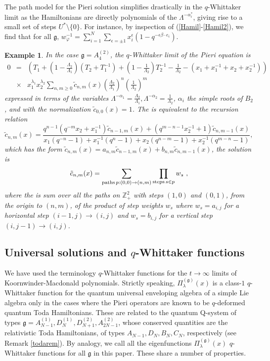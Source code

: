 \documentclass[12pt]{amsart}
\newtheorem{example}[thm]{Example}
\newcommand{\g}{{\mathfrak{g}}}
\newcommand{\Z}{{\mathbb Z}}
\newcommand{\al}{{\alpha}}
\newcommand{\lL}{{\Lambda}}
\numberwithin{equation}{section}
\begin{document}
The path model for the Pieri solution simplifies drastically in the $q$-Whittaker limit
as the Hamiltonians are directly polynomials of the $\lL^{-\al_i^*}$, giving rise to a small set of steps $U^*\setminus\{0\}$. For instance, by inspection of (\ref{Hamil}-\ref{Hamil2}), we find that for all $\g$, $w_\varphi^{-1}=\sum_{i=1}^N\sum_{\epsilon=\pm1} x_i^{\epsilon}(1-q^{-\epsilon\beta\cdot e_i})$.

%
%
%
%
%
%
%
%
%
%
%
%
%
%
%

\begin{example}
In the case $\g=A_4^{(2)}$, the $q$-Whittaker limit of the Pieri equation is
\begin{eqnarray*}
0&=&\left(T_1+\left(1-\frac{\lL_2}{\lL_1}\right) (T_2+T_1^{-1})+\left(1-\frac{1}{\lL_2}\right) T_2^{-1} -\frac{1}{\lL_2}-(x_1+x_1^{-1}+x_2+x_2^{-1})\right)\\
& \times& x_1^{\lambda_1}x_2^{\lambda_2} \sum_{n,m\geq 0}
{\tilde c}_{n,m}(x) \left(\frac{\lL_2}{\lL_1}\right)^n\left(\frac{1}{\lL_2}\right)^m
\end{eqnarray*}
expressed in terms of the variables $\lL^{-\al_1}=\frac{\lL_2}{\lL_1},\lL^{-\al_2}=\frac{1}{\lL_2}$,
$\al_i$ the simple roots of $B_2$, and  with the normalization ${\tilde c}_{0,0}(x) =1$.
The is equivalent to the recursion relation
$${\tilde c}_{n,m}(x)=\frac{q^{n-1}(q^{-m}x_2+x_1^{-1}){\tilde c}_{n-1,m}(x)+(q^{m-n-1}x_2^{-1}+1){\tilde c}_{n,m-1}(x)}{x_1(q^{-n}-1)+x_1^{-1}(q^n-1)+x_2(q^{n-m}-1)+x_2^{-1}(q^{m-n}-1)},$$
which has the form ${\tilde c}_{n,m}(x)=a_{n,m}{\tilde c}_{n-1,m}(x)+b_{n,m}{\tilde c}_{n,m-1}(x)$, the solution is
$${\tilde c}_{n,m}(x) =\sum_{{\rm paths}\, p: (0,0)\to (n,m)} \prod_{{\rm steps}\,   s\in p} w_s \ ,$$
where the is sum over all the paths on $\Z_+^2$ with steps $(1,0)$ and $(0,1)$, from the origin to $(n,m)$, of the product of step weights $w_s$ where 
$w_s=a_{i,j}$ for a horizontal step $(i-1,j)\to (i,j)$ and $w_s=b_{i,j}$ for a vertical step $(i,j-1)\to (i,j)$.
\end{example}


 
\subsection{Universal solutions and $q$-Whittaker functions}\label{sec:whitak}
We have used the terminology $q$-Whittaker functions for the $t\to\infty$ limits of Koornwinder-Macdonald polynomials. Strictly speaking,
$\Pi_\lambda^{(\g)}(x)$ is a class-$1$ $q$-Whittaker function for the quantum universal enveloping algebra of a simple Lie algebra only in the cases where the Pieri operators are known to be $q$-deformed quantum Toda Hamiltonians.
These are related to the quantum Q-system of types
$\g=A_{N-1}^{(1)},D_N^{(1)},D_{N+1}^{(2)},A_{2N-1}^{(2)}$, whose conserved quantities are the relativistic Toda Hamiltonians,
of types $A_{N-1},D_N,B_N,C_N$, respectively (see Remark \ref{todarem}). 
By analogy, we call all the eigenfunctions $\Pi_\lambda^{(\g)}(x)$ $q$-Whittaker functions for all $\g$ in this paper.
These share a number of properties.
\end{document}
